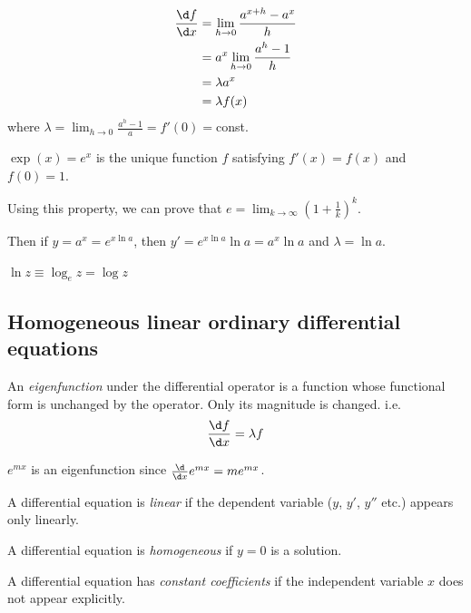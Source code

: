 \documentclass[a4paper]{article}
\begin{document}
\begin{align*}
  \frac{\d f}{\d x} &= \lim_{h\to 0}\frac{a^{x+h}-a^x}{h}\\
  &= a^x\lim_{h\to 0}\frac{a^h-1}{h}\\
  &= \lambda a^x\\
  &= \lambda f(x)
\end{align*}
where $\displaystyle \lambda = \lim_{h\to 0}\frac{a^h-1}{a} = f'(0) = $const.

\begin{defi}
  $\exp(x) = e^x$ is the unique function $f$ satisfying $f'(x) = f(x)$ and $f(0) = 1$.
\end{defi}

Using this property, we can prove that $\displaystyle e=\lim_{k\to \infty} \left(1 + \frac{1}{k}\right)^k$. 

Then if $y = a^x = e^{x\ln a}$, then $y' = e^{x\ln a}\ln a = a^x\ln a$ and $\lambda = \ln a$. 

\begin{notation}
  $\ln z \equiv \log_e z = \log z$
\end{notation}

\subsection{Homogeneous linear ordinary differential equations}
\begin{defi}[Eigenfunction]
  An \emph{eigenfunction} under the differential operator is a function whose functional form is unchanged by the operator. Only its magnitude is changed. i.e.
  \[
  \frac{\d f}{\d x} = \lambda f
  \]
\end{defi}
\begin{eg}
$e^{mx}$ is an eigenfunction since $\frac{\d }{\d x}e^{mx} = me^{mx}$.
\end{eg}

\begin{defi}
  A differential equation is \emph{linear} if the dependent variable ($y$, $y'$, $y''$ etc.) appears only linearly.
\end{defi}

\begin{defi}
  A differential equation is \emph{homogeneous} if $y=0$ is a solution.
\end{defi}

\begin{defi}
  A differential equation has \emph{constant coefficients} if the independent variable $x$ does not appear explicitly.
\end{defi}
\end{document}
